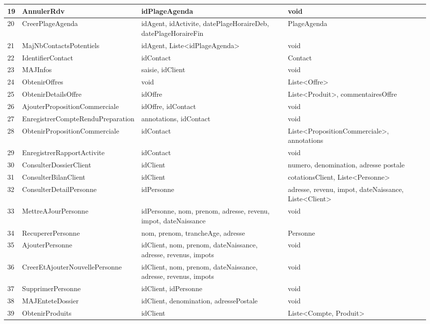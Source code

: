 \begin{table}[H]
{\begin{tabular}{p{1cm}|p{5cm}p{6cm}p{6cm}}
			19 & AnnulerRdv & idPlageAgenda &  void \\ \hline
			20 & CreerPlageAgenda & idAgent, idActivite, datePlageHoraireDeb, datePlageHoraireFin &  PlageAgenda \\ \hline
			21 & MajNbContactsPotentiels & idAgent, Liste<idPlageAgenda> &  void \\ \hline
			22 & IdentifierContact & idContact &  Contact \\ \hline
			23 & MAJInfos & saisie, idClient &  void \\ \hline
			24 & ObtenirOffres & void &  Liste<Offre> \\ \hline
			25 & ObtenirDetailsOffre & idOffre &  Liste<Produit>, commentairesOffre \\ \hline
			26 & AjouterPropositionCommerciale & idOffre, idContact &  void \\ \hline
			27 & EnregistrerCompteRenduPreparation & annotations, idContact &  void \\ \hline
			28 & ObtenirPropositionCommerciale & idContact &  Liste<PropositionCommerciale>, annotations \\ \hline
			29 & EnregistrerRapportActivite & idContact &  void \\ \hline
			30 & ConsulterDossierClient & idClient &  numero, denomination, adresse postale \\ \hline
			31 & ConsulterBilanClient & idClient &  cotationsClient, Liste<Personne> \\ \hline
			32 & ConsulterDetailPersonne & idPersonne &  adresse, revenu, impot, dateNaissance, Liste<Client> \\ \hline
			33 & MettreAJourPersonne & idPersonne, nom, prenom, adresse, revenu, impot, dateNaissance &  void \\ \hline
			34 & RecupererPersonne & nom, prenom, trancheAge, adresse &  Personne \\ \hline
			35 & AjouterPersonne & idClient, nom, prenom, dateNaissance, adresse, revenus, impots &  void \\ \hline
			36 & CreerEtAjouterNouvellePersonne & idClient, nom, prenom, dateNaissance, adresse, revenus, impots &  void \\ \hline
			37 & SupprimerPersonne & idClient, idPersonne &  void \\ \hline
			38 & MAJEnteteDossier & idClient, denomination, adressePostale &  void \\ \hline
			39 & ObtenirProduits & idClient &  Liste<Compte, Produit> \\ \hline

\end{tabular}}
\end{table}
